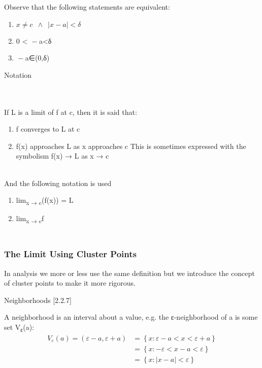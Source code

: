 Observe that the following statements are equivalent:

\begin{enumerate}
\tightlist
\item
  \(x\neq c \enspace  \wedge \enspace \lvert  x-a \rvert < \delta\)
\item
  0 \textless{}  − {a}\textbar\textless{}{δ}
\item
   − {a}\textbar∈(0,{δ})
\end{enumerate}

Notation\protect\hypertarget{notation}{}{}

~\\
~\\
If {L} is a limit of {f} at {c}, then it is said that:

\begin{enumerate}
\tightlist
\item
  {f} converges to {L} at {c}
\item
  {f}({x}) approaches {L} as {x} approaches {c} This is sometimes
  expressed with the symbolism {f}({x}) → {L} as {x} → {c}
\end{enumerate}

~\\
And the following notation is used

\begin{enumerate}
\tightlist
\item
  lim\textsubscript{{x} → {c}}({f}({x})) = {L}
\item
  lim\textsubscript{{x} → {c}}{f}
\end{enumerate}

\hypertarget{the-limit-using-cluster-points}{%
\subsubsection[\hfill\break
The Limit Using Cluster
Points]{\texorpdfstring{\protect\hypertarget{SECTION00011200000000000000}{}{}\protect\hypertarget{the-limit-using-cluster-points}{}{}~\\
The Limit Using Cluster
Points}{ The Limit Using Cluster Points}}\label{the-limit-using-cluster-points}}

In analysis we more or less use the same definition but we introduce the
concept of cluster points to make it more rigorous.

Neighborhoods {[}2.2.7{]}\protect\hypertarget{neighborhoods-2.2.7}{}{}

A neighborhood is an interval about a value, e.g. the {ε}-neighborhood
of {a} is some set {V}\textsubscript{{ε}}({a}):\\
\[\begin{aligned}
V_{\varepsilon}(a) = \left(
\varepsilon-a, \varepsilon+a
\right) &= \left\{ x :
\varepsilon - a < x <
\varepsilon + a \right\}
\\ &=
\left\{ x : -\varepsilon
< x - a < \varepsilon
\right\} \\
&= \left\{ x: \lvert x-a
\rvert < \varepsilon
\right\}
\label{nebhdef}\end{aligned}\]\\

